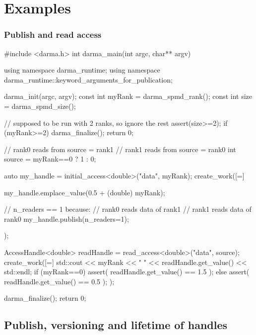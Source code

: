
\chapter{Examples}
\label{chap:examples}




\subsection{Publish and read access}

\begin{CppCodeNumb}
#include <darma.h>
int darma_main(int argc, char** argv)
{
  using namespace darma_runtime;
  using namespace darma_runtime::keyword_arguments_for_publication;

  darma_init(argc, argv);
  const int myRank = darma_spmd_rank();
  const int size = darma_spmd_size();

  // supposed to be run with 2 ranks, so ignore the rest
  assert(size>=2);
  if (myRank>=2){
    darma_finalize();
    return 0;
  }

  // rank0 reads from source = rank1 
  // rank1 reads from source = rank0 
  int source = myRank==0 ? 1 : 0;

  auto my_handle = initial_access<double>("data", myRank);
  create_work([=]
  {
    my_handle.emplace_value(0.5 + (double) myRank);

    // n_readers == 1 because: 
    //  rank0 reads data of rank1
    //  rank1 reads data of rank0
    my_handle.publish(n_readers=1);
  });

  AccessHandle<double> readHandle = read_access<double>("data", source);
  create_work([=]
  {
    std::cout << myRank << " " << readHandle.get_value() << std::endl;
    if (myRank==0)
      assert( readHandle.get_value() == 1.5 );
    else
      assert( readHandle.get_value() == 0.5 );
  });

  darma_finalize();
  return 0;
}
\end{CppCodeNumb}






\section{Publish, versioning and lifetime of handles}

